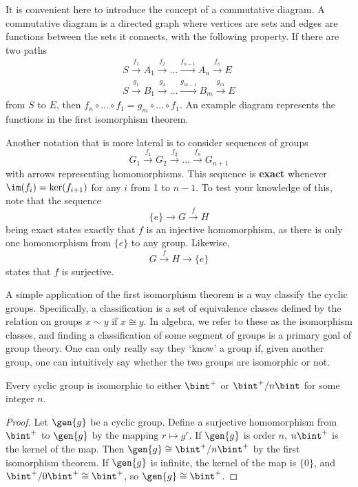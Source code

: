 It is convenient here to introduce the concept of a commutative diagram. A commutative diagram is a directed graph where vertices are sets and edges are functions between the sets it connects, with the following property. If there are two paths
%
\begin{align*}
    S \xrightarrow{f_1} A_1 \xrightarrow{f_2} \dots \xrightarrow{f_{n-1}} A_n \xrightarrow{f_n} E\\
    S \xrightarrow{g_1} B_1 \xrightarrow{g_2} \dots \xrightarrow{g_{m-1}} B_m \xrightarrow{g_m} E
\end{align*}
%
from $S$ to $E$, then $f_n \circ \dots \circ f_1 = g_m \circ \dots \circ f_1$. An example diagram represents the functions in the first isomorphism theorem.

Another notation that is more lateral is to consider sequences of groups
%
\[ G_1 \xrightarrow{f_1} G_2 \xrightarrow{f_2} \dots \xrightarrow{f_{n}}G_{n+1} \]
%
with arrows representing homomorphisms. This sequence is {\bf exact} whenever $\im(f_i) = \ker(f_{i+1})$ for any $i$ from 1 to $n-1$. To test your knowledge of this, note that the sequence
%
\[ \{ e \} \xrightarrow{} G \xrightarrow{f} H \]
%
being exact states exactly that $f$ is an injective homomorphism, as there is only one homomorphism from $\{ e \}$ to any group. Likewise,
%
\[ G \xrightarrow{f} H \xrightarrow{} \{ e \} \]
%
states that $f$ is surjective.

A simple application of the first isomorphism theorem is a way classify the cyclic groups. Specifically, a classification  is a set of equivalence classes defined by the relation on groups $x \sim y$ if $x \cong y$. In algebra, we refer to these as the isomorphism classes, and finding a classification of some segment of groups is a primary goal of group theory. One can only really say they `know' a group if, given another group, one can intuitively say whether the two groups are isomorphic or not.

\begin{theorem}
    Every cyclic group is isomorphic to either $\bint^+$ or $\bint^+/n\bint$ for some integer $n$.
\end{theorem}
\begin{proof}
Let $\gen{g}$ be a cyclic group. Define a surjective homomorphism from $\bint^+$ to $\gen{g}$ by the mapping $r \mapsto g^r$. If $\gen{g}$ is order $n$, $n\bint^+$ is the kernel of the map. Then $\gen{g} \cong \bint^+/n\bint^+$ by the first isomorphism theorem. If $\gen{g}$ is infinite, the kernel of the map is $\{ 0 \}$, and $\bint^+/0\bint^+ \cong \bint^+$, so $\gen{g} \cong \bint^+$.
\end{proof}

